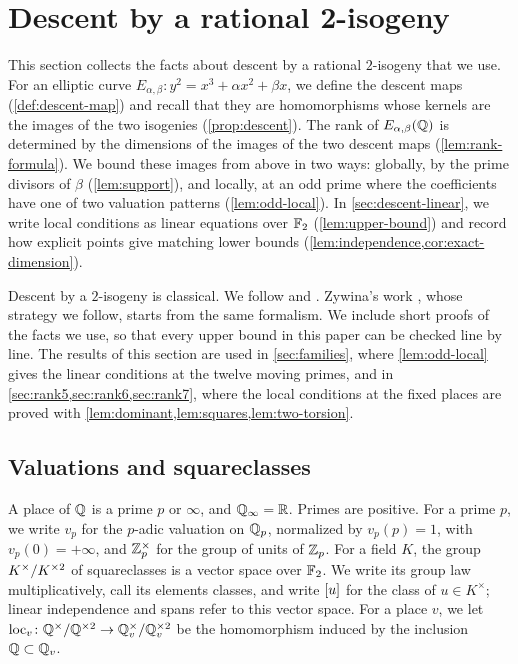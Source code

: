 \chapter{Descent by a rational 2-isogeny}\label{sec:descent}

This section collects the facts about descent by a rational $2$-isogeny that we use. For an elliptic curve $E_{\alpha,\beta}\colon y^2=x^3+\alpha x^2+\beta x$, we define the descent maps (\cref{def:descent-map}) and recall that they are homomorphisms whose kernels are the images of the two isogenies (\cref{prop:descent}). The rank of $E_{\alpha,\beta}(\mathbb Q)$ is determined by the dimensions of the images of the two descent maps (\cref{lem:rank-formula}). We bound these images from above in two ways: globally, by the prime divisors of $\beta$ (\cref{lem:support}), and locally, at an odd prime where the coefficients have one of two valuation patterns (\cref{lem:odd-local}). In \cref{sec:descent-linear}, we write local conditions as linear equations over $\mathbb F_2$ (\cref{lem:upper-bound}) and record how explicit points give matching lower bounds (\cref{lem:independence,cor:exact-dimension}).

Descent by a $2$-isogeny is classical. We follow \cite[Example~X.4.8 and Proposition~X.4.9]{SilvermanAEC} and \cite[Sections~3.4--3.6]{SilvermanTate2015}. Zywina's work \cite[Section~3]{Zywina2026}, whose strategy we follow, starts from the same formalism. We include short proofs of the facts we use, so that every upper bound in this paper can be checked line by line. The results of this section are used in \cref{sec:families}, where \cref{lem:odd-local} gives the linear conditions at the twelve moving primes, and in \cref{sec:rank5,sec:rank6,sec:rank7}, where the local conditions at the fixed places are proved with \cref{lem:dominant,lem:squares,lem:two-torsion}.

\section{Valuations and squareclasses}\label{sec:descent-conventions}

A place of $\mathbb Q$ is a prime $p$ or $\infty$, and $\mathbb Q_\infty=\mathbb R$. Primes are positive. For a prime $p$, we write $v_p$ for the $p$-adic valuation on $\mathbb Q_p$, normalized by $v_p(p)=1$, with $v_p(0)=+\infty$, and $\mathbb Z_p^\times$ for the group of units of $\mathbb Z_p$. For a field $K$, the group $K^{\times}/K^{\times2}$ of squareclasses is a vector space over $\mathbb F_2$. We write its group law multiplicatively, call its elements classes, and write $[u]$ for the class of $u\in K^\times$; linear independence and spans refer to this vector space. For a place $v$, we let $\operatorname{loc}_v\colon\mathbb Q^{\times}/\mathbb Q^{\times2}\to\mathbb Q_v^{\times}/\mathbb Q_v^{\times2}$ be the homomorphism induced by the inclusion $\mathbb Q\subset\mathbb Q_v$.

